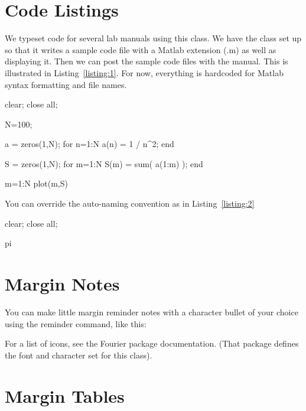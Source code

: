 \documentclass{BYUTextbook}
\begin{document}
\section{Code Listings}

We typeset code for several lab manuals using this class.  We have
the class set up so that it writes a sample code file with a Matlab
extension (.m) as well as displaying it.  Then we can post the
sample code files with the manual.  This is illustrated in
Listing~\ref{listing:1}.  For now, everything is hardcoded for
Matlab syntax formatting and file names.
\begin{codeexample}\label{listing:1}
\begin{VerbatimOut}{\listingFile}
clear; close all;

N=100;

a = zeros(1,N);
for n=1:N
    a(n) = 1 / n^2;
end

S = zeros(1,N);
for m=1:N
    S(m) = sum( a(1:m) );
end

m=1:N
plot(m,S)
\end{VerbatimOut}
\end{codeexample}

You can override the auto-naming convention as in
Listing~\ref{listing:2}
\begin{codeexample}[DisplayPi.m]\label{listing:2}
\begin{VerbatimOut}{\listingFile}
clear;
close all;

pi
\end{VerbatimOut}
\end{codeexample}


\section{Margin Notes}

You can make little margin reminder notes with a character bullet
of your choice using the reminder command, like this:


For a list of icons, see the Fourier package documentation.  (That
package defines the font and character set for this
class).

\section{Margin Tables}
\end{document}

